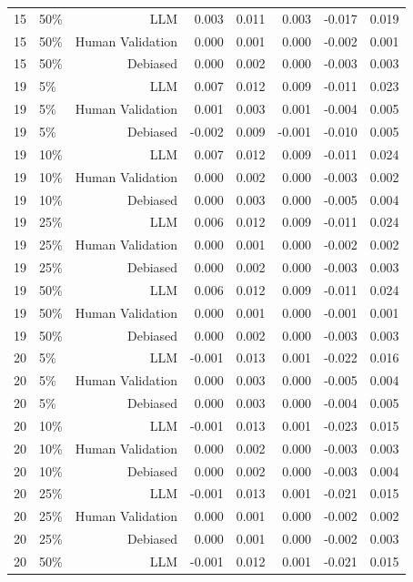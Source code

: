 \begin{table}
\begin{tabular}[t]{rlrrrrrr}
15 & 50\% & LLM & 0.003 & 0.011 & 0.003 & -0.017 & 0.019\\
15 & 50\% & Human Validation & 0.000 & 0.001 & 0.000 & -0.002 & 0.001\\
15 & 50\% & Debiased & 0.000 & 0.002 & 0.000 & -0.003 & 0.003\\
19 & 5\% & LLM & 0.007 & 0.012 & 0.009 & -0.011 & 0.023\\
19 & 5\% & Human Validation & 0.001 & 0.003 & 0.001 & -0.004 & 0.005\\
19 & 5\% & Debiased & -0.002 & 0.009 & -0.001 & -0.010 & 0.005\\
19 & 10\% & LLM & 0.007 & 0.012 & 0.009 & -0.011 & 0.024\\
19 & 10\% & Human Validation & 0.000 & 0.002 & 0.000 & -0.003 & 0.002\\
19 & 10\% & Debiased & 0.000 & 0.003 & 0.000 & -0.005 & 0.004\\
19 & 25\% & LLM & 0.006 & 0.012 & 0.009 & -0.011 & 0.024\\
19 & 25\% & Human Validation & 0.000 & 0.001 & 0.000 & -0.002 & 0.002\\
19 & 25\% & Debiased & 0.000 & 0.002 & 0.000 & -0.003 & 0.003\\
19 & 50\% & LLM & 0.006 & 0.012 & 0.009 & -0.011 & 0.024\\
19 & 50\% & Human Validation & 0.000 & 0.001 & 0.000 & -0.001 & 0.001\\
19 & 50\% & Debiased & 0.000 & 0.002 & 0.000 & -0.003 & 0.003\\
20 & 5\% & LLM & -0.001 & 0.013 & 0.001 & -0.022 & 0.016\\
20 & 5\% & Human Validation & 0.000 & 0.003 & 0.000 & -0.005 & 0.004\\
20 & 5\% & Debiased & 0.000 & 0.003 & 0.000 & -0.004 & 0.005\\
20 & 10\% & LLM & -0.001 & 0.013 & 0.001 & -0.023 & 0.015\\
20 & 10\% & Human Validation & 0.000 & 0.002 & 0.000 & -0.003 & 0.003\\
20 & 10\% & Debiased & 0.000 & 0.002 & 0.000 & -0.003 & 0.004\\
20 & 25\% & LLM & -0.001 & 0.013 & 0.001 & -0.021 & 0.015\\
20 & 25\% & Human Validation & 0.000 & 0.001 & 0.000 & -0.002 & 0.002\\
20 & 25\% & Debiased & 0.000 & 0.001 & 0.000 & -0.002 & 0.003\\
20 & 50\% & LLM & -0.001 & 0.012 & 0.001 & -0.021 & 0.015\\

\end{tabular}
\end{table}
